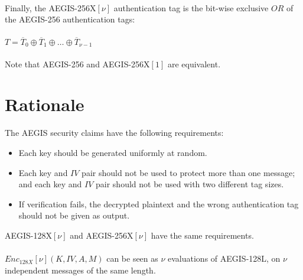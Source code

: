 \documentclass[envcountsame,runningheads,notitlepage]{llncs}
\begin{document}
\paragraph{}

Finally, the AEGIS-256X$[\nu]$ authentication tag is the bit-wise exclusive $OR$ of the AEGIS-256 authentication tags:

\paragraph{}

\begin{math}
  T = \overline{T}_0 \oplus \overline{T}_1 \oplus \ldots \oplus \overline{T}_{\nu-1}
\end{math}

\paragraph{}

Note that AEGIS-256 and AEGIS-256X$[1]$ are equivalent.

\section{Rationale}
\label{sec:rationale}

The AEGIS security claims have the following requirements:

\begin{itemize}
  \item Each key should be generated uniformly at random.
  \item Each key and $IV$ pair should not be used to protect more than one message; and each key and $IV$ pair should not be used with two different tag sizes.
  \item If verification fails, the decrypted plaintext and the wrong authentication tag should not be given as output.
\end{itemize}

AEGIS-128X$[\nu]$ and AEGIS-256X$[\nu]$ have the same requirements.

\paragraph{}

$Enc_{128X}[\nu](K, IV, A, M)$ can be seen as $\nu$ evaluations of AEGIS-128L, on $\nu$ independent messages of the same length.

\paragraph{}
\end{document}
